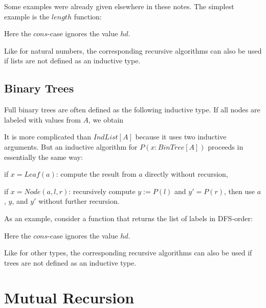 Some examples were already given elsewhere in these notes.
The simplest example is the $length$ function:
\begin{acode}
\end{acode}
Here the $cons$-case ignores the value $hd$.

Like for natural numbers, the corresponding recursive algorithms can also be used if lists are not defined as an inductive type.

\subsection{Binary Trees}

Full binary trees are often defined as the following inductive type.
If all nodes are labeled with values from $A$, we obtain
\begin{acode}
\end{acode}

It is more complicated than $IndList[A]$ because it uses two inductive arguments.
But an inductive algorithm for $P(x:BinTree[A])$ proceeds in essentially the same way:
\begin{compactitem}
 \item if $x=Leaf(a)$: compute the result from $a$ directly without recursion,
 \item if $x=Node(a,l,r)$: recursively compute $y:=P(l)$ and $y'=P(r)$, then use $a$, $y$, and $y'$  without further recursion.
\end{compactitem}

As an example, consider a function that returns the list of labels in DFS-order:
\begin{acode}
\end{acode}
Here the $cons$-case ignores the value $hd$.

Like for other types, the corresponding recursive algorithms can also be used if trees are not defined as an inductive type.


\section{Mutual Recursion}

